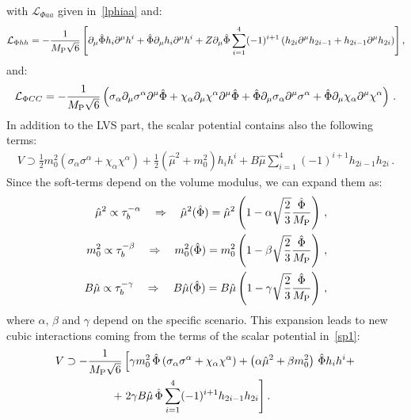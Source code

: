 \documentclass[12pt,a4paper]{book}
\def\nn{\nonumber}
\def\nn{\nonumber}
\newcommand{\mc}{\mathcal}
\begin{document}
with $\mc{L}_{\Phi aa}$ given in~\eqref{lphiaa} and:
\begin{align}
\mc{L}_{\Phi h h} =  - \frac{1}{M_{\rm P}\sqrt{6}} \left[\partial_\mu \hat\Phi h_i\partial^\mu h^i + \hat\Phi \partial_\mu h_i \partial^\mu h^i
+Z\partial_\mu \hat\Phi \sum_{i=1}^4 (-1)^{i+1}\left(h_{2i}\partial^\mu h_{2i-1} + h_{2i-1}\partial^\mu h_{2i} \right)\right], \nn
\end{align}
and:
\begin{align}
\mc{L}_{\Phi C C} = - \frac{1}{M_{\rm P}\sqrt{6}} \left(\sigma_\alpha \partial_\mu \sigma^\alpha \partial^\mu \hat\Phi + \chi_\alpha \partial_\mu \chi^\alpha \partial^\mu \hat\Phi + \hat\Phi \partial_\mu \sigma_\alpha \partial^\mu \sigma^\alpha + \hat\Phi \partial_\mu \chi_\alpha \partial^\mu \chi^\alpha\right)\,. \nn
\end{align}
In addition to the LVS part, the scalar potential contains also the following terms:
\begin{align}
\label{sp1}
V \supset \frac{1}{2}  m^2_0 \left( \sigma_\alpha\sigma^\alpha + \chi_\alpha\chi^\alpha \right) 
+ \frac 12 \left(\hat{\mu}^2+m_0^2\right) h_i h^i + B\hat{\mu} \sum_{i=1}^4 (-1)^{i+1}h_{2i-1}h_{2i}\,.
\end{align}
Since the soft-terms depend on the volume modulus, we can expand them as:
\begin{align}
\label{stexp}
\hat{\mu}^2\propto \tau_b^{-\alpha}\quad\Rightarrow\quad \hat{\mu}^2(\hat\Phi) = \hat{\mu}^2 \left(1-\alpha \sqrt{\frac 23}\frac{\hat\Phi}{M_{\rm P}}\right)\,, \nn \\
m_0^2 \propto \tau_b^{-\beta}\quad\Rightarrow\quad m_0^2(\hat\Phi) = m_0^2 \left(1-\beta \sqrt{\frac 23}\frac{\hat\Phi}{M_{\rm P}}\right)\,, \nn \\
B\hat{\mu} \propto \tau_b^{-\gamma}\quad\Rightarrow\quad B\hat{\mu} (\hat\Phi) = B\hat{\mu} \left(1-\gamma \sqrt{\frac 23}\frac{\hat\Phi}{M_{\rm P}}\right)\,,
\end{align}
where $\alpha$, $\beta$ and $\gamma$ depend on the specific scenario. This expansion leads to new cubic interactions coming from the terms of the scalar potential in~\eqref{sp1}:
\begin{align}
V\supset - \frac{1}{M_{\rm P}\sqrt{6}} &\left[\gamma m_0^2 \, \hat\Phi \left(\sigma_\alpha\sigma^\alpha  + \chi_\alpha\chi^\alpha\right) 
+\left(\alpha \hat{\mu}^2 + \beta m_0^2 \right) \, \hat \Phi h_i h^i + \right. \nonumber \\
+& \left. 2 \gamma B\hat{\mu} \, \hat \Phi \sum_{i=1}^4 (-1)^{i+1}h_{2i-1}h_{2i}\right]. \nn
\end{align}
\end{document}
